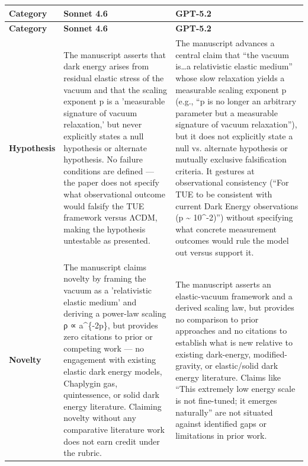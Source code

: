 \documentclass[11pt]{article}
\begin{document}
\begin{longtable}{@{} p{2.2cm} p{6.3cm} p{6.3cm} @{}}
\toprule
\textbf{Category} & \textbf{Sonnet 4.6} & \textbf{GPT-5.2} \\
\midrule
\endfirsthead
\toprule
\textbf{Category} & \textbf{Sonnet 4.6} & \textbf{GPT-5.2} \\
\midrule
\endhead
\bottomrule
\endlastfoot

\rowcolor{rowgray}
\textbf{Hypothesis} &
The manuscript asserts that dark energy arises from residual elastic stress of the vacuum and that the scaling exponent p is a 'measurable signature of vacuum relaxation,' but never explicitly states a null hypothesis or alternate hypothesis. No failure conditions are defined — the paper does not specify what observational outcome would falsify the TUE framework versus ΛCDM, making the hypothesis untestable as presented. &
The manuscript advances a central claim that “the vacuum is…a relativistic elastic medium” whose slow relaxation yields a measurable scaling exponent p (e.g., “p is no longer an arbitrary parameter but a measurable signature of vacuum relaxation”), but it does not explicitly state a null vs. alternate hypothesis or mutually exclusive falsification criteria. It gestures at observational consistency (“For TUE to be consistent with current Dark Energy observations (p \textasciitilde{} 10\textasciicircum{}-2)”) without specifying what concrete measurement outcomes would rule the model out versus support it. \\[6pt]

\textbf{Novelty} &
The manuscript claims novelty by framing the vacuum as a 'relativistic elastic medium' and deriving a power-law scaling ρ ∝ a\textasciicircum{}\{-2p\}, but provides zero citations to prior or competing work — no engagement with existing elastic dark energy models, Chaplygin gas, quintessence, or solid dark energy literature. Claiming novelty without any comparative literature work does not earn credit under the rubric. &
The manuscript asserts an elastic-vacuum framework and a derived scaling law, but provides no comparison to prior approaches and no citations to establish what is new relative to existing dark-energy, modified-gravity, or elastic/solid dark energy literature. Claims like “This extremely low energy scale is not fine-tuned; it emerges naturally” are not situated against identified gaps or limitations in prior work. \\[6pt]


\end{longtable}
\end{document}
